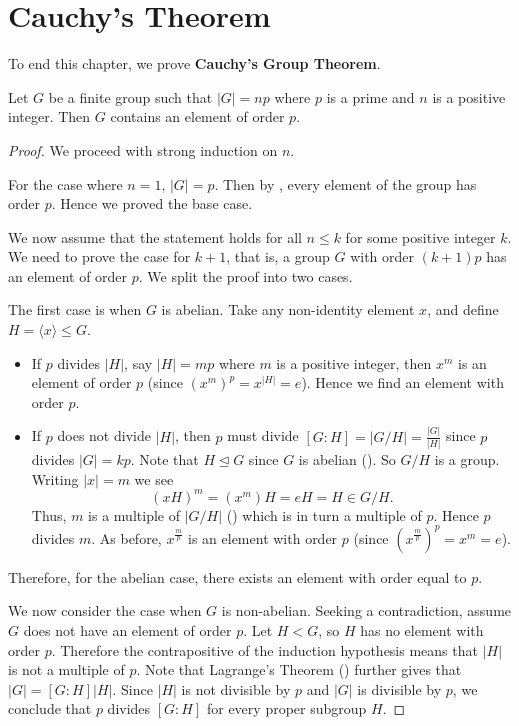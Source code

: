 \section{Cauchy's Theorem}
To end this chapter, we prove \textbf{Cauchy's Group Theorem}.
\begin{theorem}[Cauchy]\label{thrm-cauchy}
    Let $G$ be a finite group such that $|G| = np$ where $p$ is a prime and $n$ is a positive integer. Then $G$ contains an element of order $p$.
\end{theorem}
\begin{proof}
    We proceed with strong induction on $n$.

    For the case where $n = 1$, $|G| = p$. Then by , every element of the group has order $p$. Hence we proved the base case.

    We now assume that the statement holds for all $n \leq k$ for some positive integer $k$. We need to prove the case for $k+1$, that is, a group $G$ with order $(k+1)p$ has an element of order $p$. We split the proof into two cases.

    The first case is when $G$ is abelian. Take any non-identity element $x$, and define $H = \langle x \rangle \leq G$.
    \begin{itemize}
        \item If $p$ divides $|H|$, say $|H| = mp$ where $m$ is a positive integer, then $x^m$ is an element of order $p$ (since $\left(x^m\right)^p = x^{|H|} = e$). Hence we find an element with order $p$.
        \item If $p$ does not divide $|H|$, then $p$ must divide $[G:H] = |G/H| = \frac{|G|}{|H|}$ since $p$ divides $|G| = kp$. Note that $H \unlhd G$ since $G$ is abelian (). So $G/H$ is a group. Writing $|x| = m$ we see
        \[
            (xH)^m = (x^m)H = eH = H \in G/H.
        \]
        Thus, $m$ is a multiple of $|G/H|$ () which is in turn a multiple of $p$. Hence $p$ divides $m$. As before, $x^{\frac mp}$ is an element with order $p$ (since $\left(x^{\frac mp}\right)^p = x^m = e$).
    \end{itemize}
    Therefore, for the abelian case, there exists an element with order equal to $p$.

    We now consider the case when $G$ is non-abelian. Seeking a contradiction, assume $G$ does not have an element of order $p$. Let $H < G$, so $H$ has no element with order $p$. Therefore the contrapositive of the induction hypothesis means that $|H|$ is not a multiple of $p$. Note that Lagrange's Theorem () further gives that $|G| = [G:H]|H|$. Since $|H|$ is not divisible by $p$ and $|G|$ is divisible by $p$, we conclude that $p$ divides $[G:H]$ for every proper subgroup $H$.


\end{proof}
